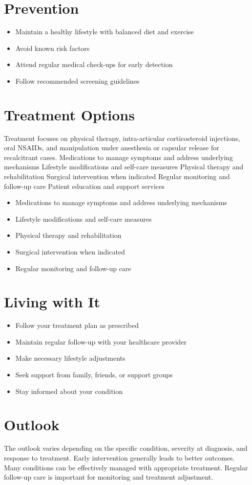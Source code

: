\section{Prevention}
\begin{itemize}[noitemsep]
  \item Maintain a healthy lifestyle with balanced diet and exercise
  \item Avoid known risk factors
  \item Attend regular medical check-ups for early detection
  \item Follow recommended screening guidelines
\end{itemize}
\section{Treatment Options}
Treatment focuses on physical therapy, intra-articular corticosteroid injections, oral NSAIDs, and manipulation under anesthesia or capsular release for recalcitrant cases. Medications to manage symptoms and address underlying mechanisms Lifestyle modifications and self-care measures Physical therapy and rehabilitation Surgical intervention when indicated Regular monitoring and follow-up care Patient education and support services

\begin{itemize}[noitemsep]
  \item Medications to manage symptoms and address underlying mechanisms
  \item Lifestyle modifications and self-care measures
  \item Physical therapy and rehabilitation
  \item Surgical intervention when indicated
  \item Regular monitoring and follow-up care
\end{itemize}
\section{Living with It}
\begin{itemize}[noitemsep]
  \item Follow your treatment plan as prescribed
  \item Maintain regular follow-up with your healthcare provider
  \item Make necessary lifestyle adjustments
  \item Seek support from family, friends, or support groups
  \item Stay informed about your condition
\end{itemize}
\section{Outlook}
The outlook varies depending on the specific condition, severity at diagnosis, and response to treatment. Early intervention generally leads to better outcomes. Many conditions can be effectively managed with appropriate treatment. Regular follow-up care is important for monitoring and treatment adjustment.
